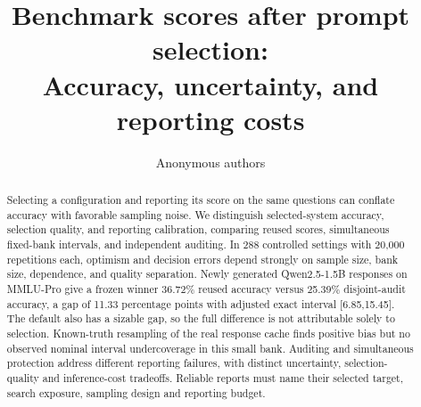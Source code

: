\documentclass{article}
\title{Benchmark scores after prompt selection:\\Accuracy, uncertainty, and reporting costs}
\author{Anonymous authors}
\begin{document}
\maketitle
\begin{abstract}
Selecting a configuration and reporting its score on the same questions can conflate accuracy with favorable sampling noise. We distinguish selected-system accuracy, selection quality, and reporting calibration, comparing reused scores, simultaneous fixed-bank intervals, and independent auditing. In 288 controlled settings with 20,000 repetitions each, optimism and decision errors depend strongly on sample size, bank size, dependence, and quality separation. Newly generated Qwen2.5-1.5B responses on MMLU-Pro give a frozen winner 36.72\% reused accuracy versus 25.39\% disjoint-audit accuracy, a gap of 11.33 percentage points with adjusted exact interval [6.85,15.45]. The default also has a sizable gap, so the full difference is not attributable solely to selection. Known-truth resampling of the real response cache finds positive bias but no observed nominal interval undercoverage in this small bank. Auditing and simultaneous protection address different reporting failures, with distinct uncertainty, selection-quality and inference-cost tradeoffs. Reliable reports must name their selected target, search exposure, sampling design and reporting budget.
\end{abstract}






\clearpage
\label{post-main-start}



\clearpage
\appendix

\clearpage

\clearpage

\end{document}
